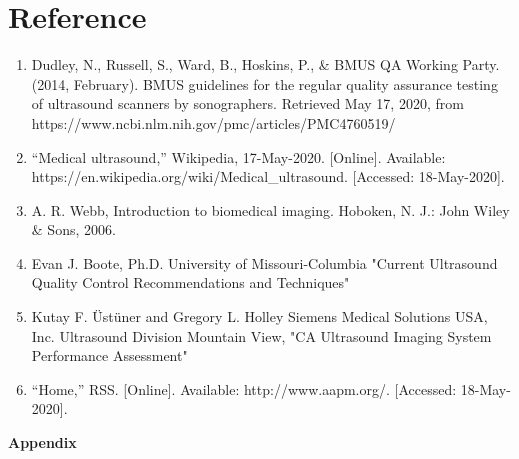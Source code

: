 \documentclass[12pt]{article}
\begin{document}
\section{Reference}
\begin{enumerate}

    \item Dudley, N., Russell, S., Ward, B., Hoskins, P., \& BMUS QA Working Party. (2014, February). BMUS guidelines for the regular quality assurance testing of ultrasound scanners by sonographers. Retrieved May 17, 2020, from https://www.ncbi.nlm.nih.gov/pmc/articles/PMC4760519/
    \item “Medical ultrasound,” Wikipedia, 17-May-2020. [Online]. Available: https://en.wikipedia.org/wiki/Medical\_ultrasound. [Accessed: 18-May-2020].
    \item A. R. Webb, Introduction to biomedical imaging. Hoboken, N. J.: John Wiley \& Sons, 2006.
    \item Evan J. Boote, Ph.D. University of Missouri-Columbia "Current Ultrasound Quality Control Recommendations and Techniques" 
    \item Kutay F. Üstüner and Gregory L. Holley Siemens Medical Solutions USA, Inc. Ultrasound Division Mountain View, "CA Ultrasound Imaging System Performance Assessment"
    \item “Home,” RSS. [Online]. Available: http://www.aapm.org/. [Accessed: 18-May-2020].
    
    
\end{enumerate}
\pagebreak
\textbf{\Large{Appendix}}
\begin{appendix}
  \listoffigures
\end{appendix}
\end{document}
